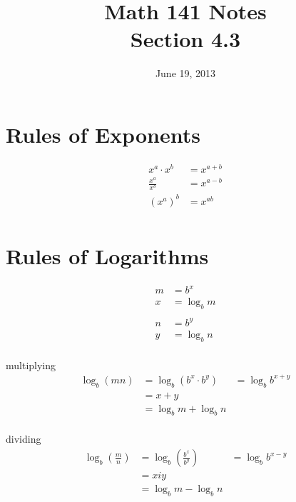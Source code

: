 \documentclass{exam}
\title{Math 141 Notes \\ Section 4.3}
\date{June 19, 2013}
\begin{document}
  \maketitle
  \tableofcontents

  \section{Rules of Exponents}

  \begin{align*}
    x^a \cdot x^b        &= x^{a + b} \\
    \frac{x^a}{x^b}      &= x^{a - b} \\
    \left( x^a \right)^b &= x^{ab} \\
  \end{align*}

  \section{Rules of Logarithms}

  \begin{align*}
    m &= b^x \\
    x &= \log_b m \\
    \\
    n &= b^y \\
    y &= \log_b n \\
  \end{align*}

  multiplying
  \begin{align*}
    \log_b \left( mn \right) &= \log_b \left( b^x \cdot b^y \right)
                             &= \log_b b^{x + y} \\
                             &= x + y \\
                             &= \log_b m + \log_b n \\
  \end{align*}

  dividing
  \begin{align*}
    \log_b \left( \frac{m}{n} \right) &= \log_b \left( \frac{b^x}{b^y} \right)
                             &= \log_b b^{x - y} \\
                             &= x i y \\
                             &= \log_b m - \log_b n \\
  \end{align*}
\end{document}
